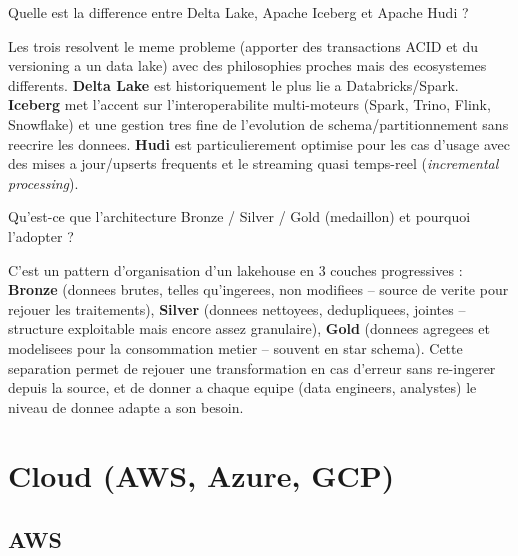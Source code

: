 \documentclass[11pt,a4paper]{article}
\begin{document}
\begin{question} Quelle est la difference entre Delta Lake, Apache Iceberg et Apache Hudi ?
\end{question}
\begin{reponse}
Les trois resolvent le meme probleme (apporter des transactions ACID et du versioning a un data lake) avec des philosophies proches mais des ecosystemes differents. \textbf{Delta Lake} est historiquement le plus lie a Databricks/Spark. \textbf{Iceberg} met l'accent sur l'interoperabilite multi-moteurs (Spark, Trino, Flink, Snowflake) et une gestion tres fine de l'evolution de schema/partitionnement sans reecrire les donnees. \textbf{Hudi} est particulierement optimise pour les cas d'usage avec des mises a jour/upserts frequents et le streaming quasi temps-reel (\emph{incremental processing}).
\end{reponse}

\begin{question} Qu'est-ce que l'architecture Bronze / Silver / Gold (medaillon) et pourquoi l'adopter ?
\end{question}
\begin{reponse}
C'est un pattern d'organisation d'un lakehouse en 3 couches progressives : \textbf{Bronze} (donnees brutes, telles qu'ingerees, non modifiees -- source de verite pour rejouer les traitements), \textbf{Silver} (donnees nettoyees, dedupliquees, jointes -- structure exploitable mais encore assez granulaire), \textbf{Gold} (donnees agregees et modelisees pour la consommation metier -- souvent en star schema). Cette separation permet de rejouer une transformation en cas d'erreur sans re-ingerer depuis la source, et de donner a chaque equipe (data engineers, analystes) le niveau de donnee adapte a son besoin.
\end{reponse}

\newpage
\section{Cloud (AWS, Azure, GCP)}

\subsection{AWS}
\end{document}
